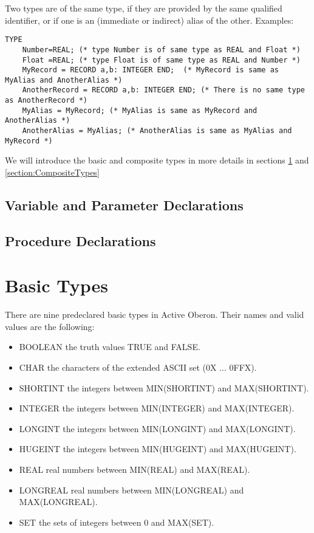 \documentclass[a4paper,11pt]{article}
\begin{document}
Two types are of the same type, if they are provided by the same qualified identifier, or if one is an (immediate or indirect) alias of the other. Examples:
\begin{lstlisting}[language=Oberon,frame=none,caption={Same and different types}]
TYPE
    Number=REAL; (* type Number is of same type as REAL and Float *)
    Float =REAL; (* type Float is of same type as REAL and Number *)
    MyRecord = RECORD a,b: INTEGER END;  (* MyRecord is same as MyAlias and AnotherAlias *)
    AnotherRecord = RECORD a,b: INTEGER END; (* There is no same type as AnotherRecord *)
    MyAlias = MyRecord; (* MyAlias is same as MyRecord and AnotherAlias *)
    AnotherAlias = MyAlias; (* AnotherAlias is same as MyAlias and MyRecord *)
\end{lstlisting}

We will introduce the basic and composite types in more details in sections \ref{section:BasicTypes} and \ref{section:CompositeTypes}

\subsection{Variable and Parameter Declarations}

\subsection{Procedure Declarations}

\section{Basic Types}\label{section:BasicTypes}
There are nine predeclared basic types in Active Oberon. Their names and valid values are the following:

\begin{itemize}
\item BOOLEAN the truth values TRUE and FALSE. 
\item CHAR the characters of the extended ASCII set (0X ... 0FFX). 
\item SHORTINT the integers between MIN(SHORTINT) and MAX(SHORTINT). 
\item INTEGER the integers between MIN(INTEGER) and MAX(INTEGER). 
\item LONGINT the integers between MIN(LONGINT) and MAX(LONGINT). 
\item HUGEINT the integers between MIN(HUGEINT) and MAX(HUGEINT). 
\item REAL real numbers between MIN(REAL) and MAX(REAL). 
\item LONGREAL real numbers between MIN(LONGREAL) and MAX(LONGREAL). 
\item SET the sets of integers between 0 and MAX(SET). 
\end{itemize}
\end{document}
